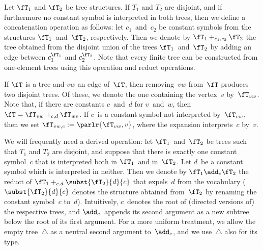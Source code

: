 \documentclass{LMCS}
\begin{document}
Let $\fT_1$ and $\fT_2$ be tree structures.
If $T_1$ and $T_2$ are disjoint,
and if furthermore no constant symbol is interpreted in both trees,
then we define a concatenation operation as follows\?:
let $c_1$~and~$c_2$ be constant symbols from the structures
$\fT_1$~and~$\fT_2$, respectively.
Then we denote by $\fT_1 +_{c_1,c_2} \fT_2$ the tree
obtained from the disjoint union of the trees $\fT_1$~and~$\fT_2$
by adding an edge between $c_1^{\fT_1}$ and $c_2^{\fT_2}$.
Note that every finite tree
can be constructed from one-element trees using this operation and reduct operations.

If $\fT$ is a tree and $vw$ an edge of~$\fT$,
then removing~$vw$ from~$\fT$ produces two disjoint trees.
Of these, we denote the one containing the vertex~$v$ by~$\fT_{vw}$.
Note that, if there are constants $c$~and~$d$ for $v$~and~$w$,
then $\fT = \fT_{vw} +_{c,d} \fT_{wv}$.
If $c$~is a constant symbol not interpreted by~$\fT_{vw}$,
then we set $\fT_{vw,c} := \parlr{\fT_{vw},v}$,
where the expansion interprets~$c$ by~$v$.

We will frequently need a derived operation\?:
let $\fT_1$~and~$\fT_2$ be trees
such that $T_1$ and $T_2$ are disjoint, and
suppose that there is exactly one constant symbol~$c$
that is interpreted both in $\fT_1$~and in~$\fT_2$.
Let $d$~be a constant symbol which is interpreted in neither.
Then we denote by $\fT_1 \add_c \fT_2$
the reduct of $\fT_1 +_{c,d} \subst{\fT_2}{d}{c}$
that expels~$d$ from the vocabulary ($\subst{\fT_2}{d}{c}$ denotes
the structure obtained from~$\fT_2$ by renaming the constant symbol~$c$
to~$d$).
Intuitively,
$c$~denotes the root of (directed versions of) the respective trees,
and $\add_c$~appends its second argument as a new subtree
below the root of its first argument.
For a more uniform treatment,
we allow the empty tree~$\triangle$
as a neutral second argument to~$\add_c$, and
we use~$\triangle$ also for its type.
\end{document}
